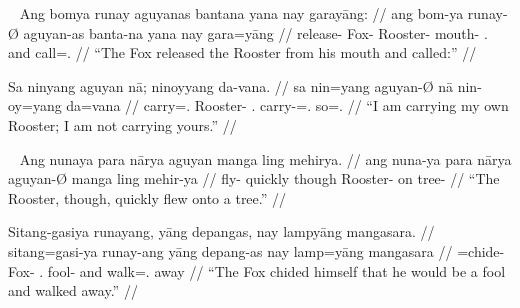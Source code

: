 \xe

\pex~ %
\a\begingl
	\gla Ang bomya runay aguyanas bantana yana nay garayāng: //
	\glb ang bom-ya runay-Ø aguyan-as banta-na yana nay gara=yāng //
	\glc \AgtT{} release-\TsgM{} Fox-\Top{} Rooster-\Parg{} mouth-\Gen{} \TsgM{}.\Gen{} and call=\TsgM{}.\Aarg{} //
	\glft \enquote{The Fox released the Rooster from his mouth and called:} //
\endgl

\a\begingl
	\gla Sa ninyang aguyan nā; ninoyyang da-vana. //
	\glb sa nin=yang aguyan-Ø nā nin-oy=yang da=vana //
	\glc \PatT{} carry=\Fsg{}.\Aarg{} Rooster-\Top{} \Fsg{}.\Gen{} carry-\Neg{}=\Fsg{}.\Aarg{} so=\Spl{}.\Gen{} //
	\glft \enquote{I am carrying my own Rooster; I am not carrying yours.} //
\endgl

\xe

\pex~ %
\a\begingl
	\gla Ang nunaya para nārya aguyan manga ling mehirya. //
	\glb ang nuna-ya para nārya aguyan-Ø manga ling mehir-ya //
	\glc \AgtT{} fly-\TsgM{} quickly though Rooster-\Top{} \Dyn{} on tree-\Loc{} //
	\glft \enquote{The Rooster, though, quickly flew onto a tree.} //
\endgl

\a\label{ex:objpred}\begingl
	\gla Sitang-gasiya runayang, yāng depangas, nay lampyāng mangasara. //
	\glb sitang=gasi-ya runay-ang yāng depang-as nay lamp=yāng mangasara //
	\glc \Refl{}=chide-\TsgM{} Fox-\Aarg{} \TsgM{}.\Aarg{} fool-\Parg{} and walk=\TsgM{}.\Aarg{} away //
	\glft \enquote{The Fox chided himself that he would be a fool and walked away.} //
\endgl

\xe
